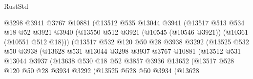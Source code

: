 \begin{lexlean}{RustStd}
\begin{coremodule}
                            @3298
                            @3941
                            @3767
                            @10881
                            (@13512
                              @535
                              @13044
                              @3941
                              (@13517
                                @513
                                @534
                                @18
                                @52
                                @3921
                                @3940
                                (@13550
                                  @512
                                  @3921
                                  (@10545 (@10546 @3921))
                                  (@10361 (@10551 @512 @18)))
                                (@13517
                                  @532
                                  @120
                                  @50
                                  @28
                                  @3938
                                  @3292
                                  (@13525
                                    @532
                                    @50
                                    @3938
                                    (@13628
                                      @531
                                      @13044
                                      @3298
                                      @3937
                                      @3767
                                      @10881
                                      (@13512
                                        @531
                                        @13044
                                        @3937
                                        (@13638
                                          @530
                                          @18
                                          @52
                                          @3857
                                          @3936
                                          @13652
                                          (@13517
                                            @528
                                            @120
                                            @50
                                            @28
                                            @3934
                                            @3292
                                            (@13525
                                              @528
                                              @50
                                              @3934
                                              (@13628

\end{coremodule}
\end{lexlean}
